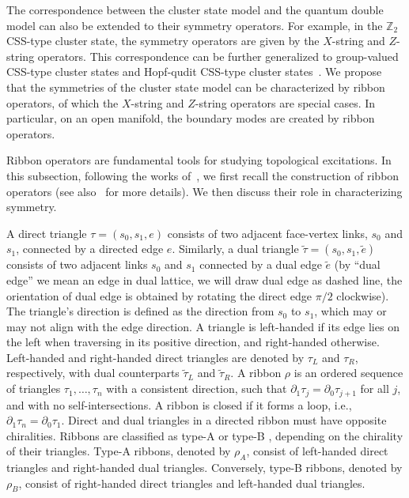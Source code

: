 \documentclass[a4paper,11pt]{article}
\theoremstyle{theorem}
\theoremstyle{remark}
\newcommand{\Zbb}{\mathbb{Z}}
\begin{document}
The correspondence between the cluster state model and the quantum double model can also be extended to their symmetry operators. 
For example, in the $\Zbb_2$ CSS-type cluster state, the symmetry operators are given by the $X$-string and $Z$-string operators. 
This correspondence can be further generalized to group-valued CSS-type cluster states and Hopf-qudit CSS-type cluster states~\cite{fechisin2023noninvertible,jia2024generalized}. 
We propose that the symmetries of the cluster state model can be characterized by ribbon operators, of which the $X$-string and $Z$-string operators are special cases. 
In particular, on an open manifold, the boundary modes are created by ribbon operators.



Ribbon operators are fundamental tools for studying topological excitations. 
In this subsection, following the works of~\cite{Kitaev2003,Bombin2008family,Cong2017,chen2021ribbon,jia2023boundary,Jia2023weak}, 
we first recall the construction of ribbon operators (see also~\cite{jia2023boundary,Jia2023weak} for more details). 
We then discuss their role in characterizing symmetry.


A direct triangle $\tau = (s_0, s_1, e)$ consists of two adjacent face-vertex links, $s_0$ and $s_1$, connected by a directed edge $e$. Similarly, a dual triangle $\tilde{\tau} = (s_0, s_1, \tilde{e})$ consists of two adjacent links $s_0$ and $s_1$ connected by a dual edge $\tilde{e}$ (by ``dual edge'' we mean an edge in dual lattice, we will draw dual edge as dashed line, the orientation of dual edge is obtained by rotating the direct edge $\pi/2$ clockwise). The triangle’s direction is defined as the direction from $s_0$ to $s_1$, which may or may not align with the edge direction.
A triangle is left-handed if its edge lies on the left when traversing in its positive direction, and right-handed otherwise. Left-handed and right-handed direct triangles are denoted by $\tau_L$ and $\tau_R$, respectively, with dual counterparts $\tilde{\tau}_L$ and $\tilde{\tau}_R$.
A ribbon $\rho$ is an ordered sequence of triangles $\tau_1, \dots, \tau_n$ with a consistent direction, such that $\partial_1 \tau_j = \partial_0 \tau_{j+1}$ for all $j$, and with no self-intersections. A ribbon is closed if it forms a loop, i.e., $\partial_1 \tau_n = \partial_0 \tau_1$. Direct and dual triangles in a directed ribbon must have opposite chiralities.
Ribbons are classified as type-A or type-B \cite{jia2023boundary,Jia2023weak}, depending on the chirality of their triangles. Type-A ribbons, denoted by $\rho_A$, consist of left-handed direct triangles and right-handed dual triangles. Conversely, type-B ribbons, denoted by $\rho_B$, consist of right-handed direct triangles and left-handed dual triangles.
\end{document}
